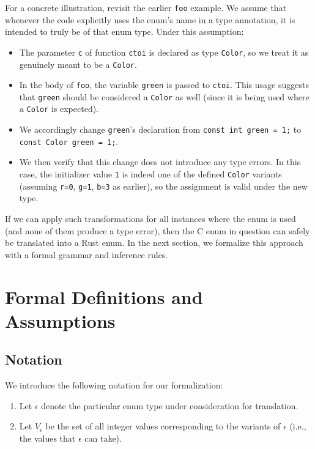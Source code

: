 \documentclass[peerreview, 10pt]{IEEEtran}
\begin{document}
For a concrete illustration, revisit the earlier \texttt{foo} example. We assume that whenever the code explicitly uses the enum's name in a type annotation, it is intended to truly be of that enum type. Under this assumption:
\begin{itemize}
    \item The parameter \texttt{c} of function \texttt{ctoi} is declared as type \texttt{Color}, so we treat it as genuinely meant to be a \texttt{Color}.
    \item In the body of \texttt{foo}, the variable \texttt{green} is passed to \texttt{ctoi}. This usage suggests that \texttt{green} should be considered a \texttt{Color} as well (since it is being used where a \texttt{Color} is expected).
    \item We accordingly change \texttt{green}'s declaration from \texttt{const int green = 1;} to \texttt{const Color green = 1;}.
    \item We then verify that this change does not introduce any type errors. In this case, the initializer value \texttt{1} is indeed one of the defined \texttt{Color} variants (assuming \texttt{r=0}, \texttt{g=1}, \texttt{b=3} as earlier), so the assignment is valid under the new type.
\end{itemize}

If we can apply such transformations for all instances where the enum is used (and none of them produce a type error), then the C enum in question can safely be translated into a Rust enum. In the next section, we formalize this approach with a formal grammar and inference rules.

\section{Formal Definitions and Assumptions}

\subsection{Notation}

We introduce the following notation for our formalization:
\begin{enumerate}
    \item Let $\epsilon$ denote the particular enum type under consideration for translation.
    \item Let $V_\epsilon$ be the set of all integer values corresponding to the variants of $\epsilon$ (i.e., the values that $\epsilon$ can take).
\end{enumerate}
\end{document}
